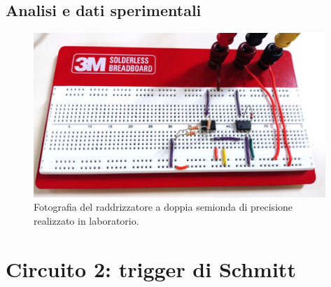 \documentclass{report}
\begin{document}
\subsection{Analisi e dati sperimentali}
\begin{figure}[h]
	\centering
	\includegraphics[height=6.2cm]{immagini/circuito1}
	\caption{Fotografia del raddrizzatore a doppia semionda di precisione realizzato in laboratorio.}
	\label{figura:circuito1}
\end{figure}

\section{Circuito 2: trigger di Schmitt}
\end{document}
